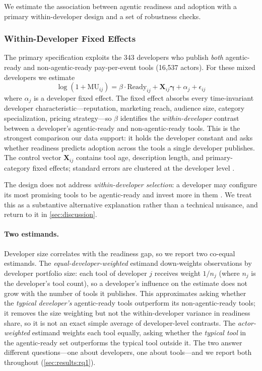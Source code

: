 We estimate the association between agentic readiness and adoption with a
primary within-developer design and a set of robustness checks.

\subsubsection{Within-Developer Fixed Effects}

The primary specification exploits the 343 developers who publish \emph{both}
agentic-ready and non-agentic-ready pay-per-event tools (16{,}537 actors). For
these mixed developers we estimate
\begin{equation}
\label{eq:fe}
\log(1 + \text{MU}_{ij}) = \beta \cdot \text{Ready}_{ij}
  + \mathbf{X}_{ij} \boldsymbol{\gamma} + \alpha_j + \epsilon_{ij}
\end{equation}
where $\alpha_j$ is a developer fixed effect. The fixed effect absorbs every
time-invariant developer characteristic---reputation, marketing reach, audience
size, category specialization, pricing strategy---so $\beta$ identifies the
\emph{within-developer} contrast between a developer's agentic-ready and
non-agentic-ready tools. This is the strongest comparison our data support: it
holds the developer constant and asks whether readiness predicts adoption
across the tools a single developer publishes. The control vector
$\mathbf{X}_{ij}$ contains tool age, description length, and primary-category
fixed effects; standard errors are clustered at the developer level
\cite{wooldridge2010econometric}.

The design does not address \emph{within-developer selection}: a developer may
configure its most promising tools to be agentic-ready and invest more in them
\cite{boudreau2012complementors}. We treat this as a substantive alternative
explanation rather than a technical nuisance, and return to it in
\autoref{sec:discussion}.

\paragraph{Two estimands.} Developer size correlates with the readiness gap,
so we report two co-equal estimands. The \emph{equal-developer-weighted}
estimand down-weights observations by developer portfolio size: each tool of
developer $j$ receives weight $1/n_j$ (where $n_j$ is the developer's tool
count), so a developer's influence on the estimate does not grow with the number
of tools it publishes. This approximates asking whether the \emph{typical
developer's} agentic-ready tools outperform its non-agentic-ready tools; it
removes the size weighting but not the within-developer variance in readiness
share, so it is not an exact simple average of developer-level contrasts. The
\emph{actor-weighted} estimand weights each tool equally, asking whether the
\emph{typical tool} in the agentic-ready set outperforms the typical tool
outside it. The two answer different questions---one about developers, one about
tools---and we report both throughout (\autoref{sec:results:rq1}).

